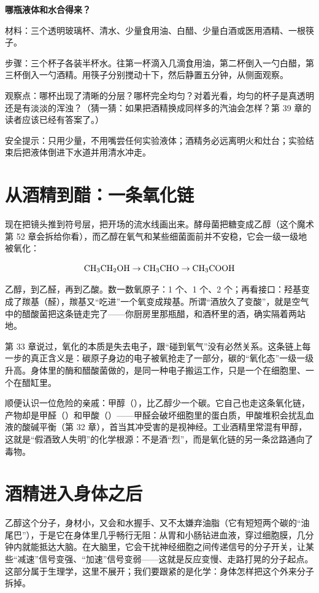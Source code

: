\begin{shiyan}
\textbf{哪瓶液体和水合得来？}

材料：三个透明玻璃杯、清水、少量食用油、白醋、少量白酒或医用酒精、一根筷子。

步骤：三个杯子各装半杯水。往第一杯滴入几滴食用油，第二杯倒入一勺白醋，第三杯倒入一勺酒精。用筷子分别搅动十下，然后静置五分钟，从侧面观察。

观察点：哪杯出现了清晰的分层？哪杯完全均匀？对着光看，均匀的杯子是真透明还是有淡淡的浑浊？（猜一猜：如果把酒精换成同样多的汽油会怎样？第 39 章的读者应该已经有答案了。）

安全提示：只用少量，不用嘴尝任何实验液体；酒精务必远离明火和灶台；实验结束后把液体倒进下水道并用清水冲走。
\end{shiyan}

\section{从酒精到醋：一条氧化链}

现在把镜头推到符号层，把开场的流水线画出来。酵母菌把糖变成乙醇（这个魔术第 52 章会拆给你看），而乙醇在氧气和某些细菌面前并不安稳，它会一级一级地被氧化：

\[\mathrm{CH_3CH_2OH} \rightarrow \mathrm{CH_3CHO} \rightarrow \mathrm{CH_3COOH}\]

乙醇，到乙醛，再到乙酸。数一数氧原子：1 个、1 个、2 个；再看接口：羟基变成了羰基（醛），羰基又“吃进”一个氧变成羧基。所谓“酒放久了变酸”，就是空气中的醋酸菌把这条链走完了——你厨房里那瓶醋，和酒杯里的酒，确实隔着两站地。

第 33 章说过，氧化的本质是失去电子，跟“碰到氧气”没有必然关系。这条链上每一步的真正含义是：碳原子身边的电子被氧抢走了一部分，碳的“氧化态”一级一级升高。身体里的酶和醋酸菌做的，是同一种电子搬运工作，只是一个在细胞里、一个在醋缸里。

顺便认识一位危险的亲戚：甲醇（），比乙醇少一个碳。它自己也走这条氧化链，产物却是甲醛（）和甲酸（）——甲醛会破坏细胞里的蛋白质，甲酸堆积会扰乱血液的酸碱平衡（第 32 章），首当其冲受害的是视神经。工业酒精里常混有甲醇，这就是“假酒致人失明”的化学根源：不是酒“烈”，而是氧化链的另一条岔路通向了毒物。

\section{酒精进入身体之后}

乙醇这个分子，身材小，又会和水握手、又不太嫌弃油脂（它有短短两个碳的“油尾巴”），于是它在身体里几乎畅行无阻：从胃和小肠钻进血液，穿过细胞膜，几分钟内就能抵达大脑。在大脑里，它会干扰神经细胞之间传递信号的分子开关，让某些“减速”信号变强、“加速”信号变弱——这就是反应变慢、走路打晃的分子起点。这部分属于生理学，这里不展开；我们要跟紧的是化学：身体怎样把这个外来分子拆掉。

